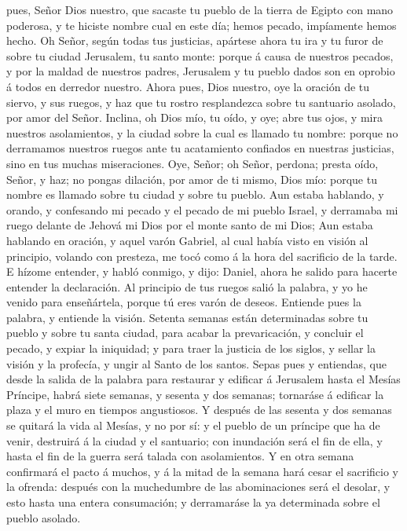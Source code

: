pues, Señor Dios nuestro, que sacaste tu pueblo de la tierra de Egipto
con mano poderosa, y te hiciste nombre cual en este día; hemos pecado,
impíamente hemos hecho.  Oh Señor, según todas tus
justicias, apártese ahora tu ira y tu furor de sobre tu ciudad
Jerusalem, tu santo monte: porque á causa de nuestros pecados, y por la
maldad de nuestros padres, Jerusalem y tu pueblo dados son en oprobio á
todos en derredor nuestro.  Ahora pues, Dios nuestro, oye
la oración de tu siervo, y sus ruegos, y haz que tu rostro resplandezca
sobre tu santuario asolado, por amor del Señor.  Inclina,
oh Dios mío, tu oído, y oye; abre tus ojos, y mira nuestros
asolamientos, y la ciudad sobre la cual es llamado tu nombre: porque no
derramamos nuestros ruegos ante tu acatamiento confiados en nuestras
justicias, sino en tus muchas miseraciones.  Oye, Señor;
oh Señor, perdona; presta oído, Señor, y haz; no pongas dilación, por
amor de ti mismo, Dios mío: porque tu nombre es llamado sobre tu ciudad
y sobre tu pueblo.  Aun estaba hablando, y orando, y
confesando mi pecado y el pecado de mi pueblo Israel, y derramaba mi
ruego delante de Jehová mi Dios por el monte santo de mi Dios;
 Aun estaba hablando en oración, y aquel varón Gabriel,
al cual había visto en visión al principio, volando con presteza, me
tocó como á la hora del sacrificio de la tarde.  E hízome
entender, y habló conmigo, y dijo: Daniel, ahora he salido para hacerte
entender la declaración.  Al principio de tus ruegos
salió la palabra, y yo he venido para enseñártela, porque tú eres varón
de deseos. Entiende pues la palabra, y entiende la visión.
 Setenta semanas están determinadas sobre tu pueblo y
sobre tu santa ciudad, para acabar la prevaricación, y concluir el
pecado, y expiar la iniquidad; y para traer la justicia de los siglos, y
sellar la visión y la profecía, y ungir al Santo de los santos.
 Sepas pues y entiendas, que desde la salida de la
palabra para restaurar y edificar á Jerusalem hasta el Mesías Príncipe,
habrá siete semanas, y sesenta y dos semanas; tornaráse á edificar la
plaza y el muro en tiempos angustiosos.  Y después de las
sesenta y dos semanas se quitará la vida al Mesías, y no por sí: y el
pueblo de un príncipe que ha de venir, destruirá á la ciudad y el
santuario; con inundación será el fin de ella, y hasta el fin de la
guerra será talada con asolamientos.  Y en otra semana
confirmará el pacto á muchos, y á la mitad de la semana hará cesar el
sacrificio y la ofrenda: después con la muchedumbre de las abominaciones
será el desolar, y esto hasta una entera consumación; y derramaráse la
ya determinada sobre el pueblo asolado.

